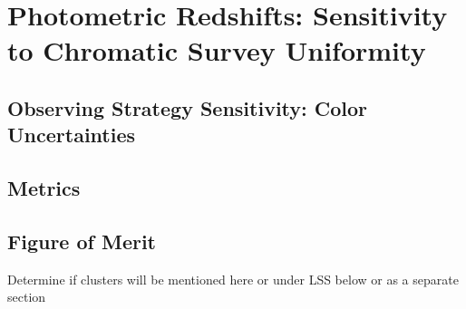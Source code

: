%
%
%
%
%
%
%
\clearpage
\section{Photometric Redshifts:  Sensitivity to Chromatic Survey Uniformity}
\def\secname{photoz}\label{sec:\secname}





\subsection{Observing Strategy Sensitivity:  Color Uncertainties}
\label{sec:\secname:sensitivity}




\subsection{Metrics}
\label{sec:\secname:metrics}




\subsection{Figure of Merit}
\label{sec:\secname:fom}

 Determine if clusters will be mentioned here or under LSS below or as a separate section

\navigationbar

